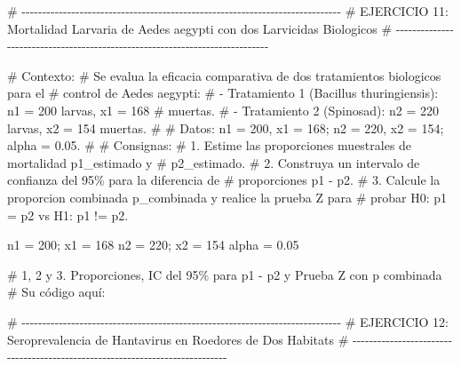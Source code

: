 \documentclass[
  spanish,
  letterpaper,
  DIV=11,
  numbers=noendperiod]{scrreprt}
\newenvironment{Shaded}{\begin{snugshade}}{\end{snugshade}}
\newcommand{\CommentTok}[1]{\textcolor[rgb]{0.37,0.37,0.37}{#1}}
\newcommand{\DecValTok}[1]{\textcolor[rgb]{0.68,0.00,0.00}{#1}}
\newcommand{\FloatTok}[1]{\textcolor[rgb]{0.68,0.00,0.00}{#1}}
\newcommand{\NormalTok}[1]{\textcolor[rgb]{0.00,0.23,0.31}{#1}}
\newcommand{\OtherTok}[1]{\textcolor[rgb]{0.00,0.23,0.31}{#1}}
\begin{document}
\begin{Shaded}
\begin{Highlighting}[]
\CommentTok{\# {-}{-}{-}{-}{-}{-}{-}{-}{-}{-}{-}{-}{-}{-}{-}{-}{-}{-}{-}{-}{-}{-}{-}{-}{-}{-}{-}{-}{-}{-}{-}{-}{-}{-}{-}{-}{-}{-}{-}{-}{-}{-}{-}{-}{-}{-}{-}{-}{-}{-}{-}{-}{-}{-}{-}{-}{-}{-}{-}{-}{-}{-}{-}{-}{-}{-}{-}{-}{-}{-}{-}{-}{-}{-}{-}{-}{-}}
\CommentTok{\# EJERCICIO 11: Mortalidad Larvaria de Aedes aegypti con dos Larvicidas Biologicos}
\CommentTok{\# {-}{-}{-}{-}{-}{-}{-}{-}{-}{-}{-}{-}{-}{-}{-}{-}{-}{-}{-}{-}{-}{-}{-}{-}{-}{-}{-}{-}{-}{-}{-}{-}{-}{-}{-}{-}{-}{-}{-}{-}{-}{-}{-}{-}{-}{-}{-}{-}{-}{-}{-}{-}{-}{-}{-}{-}{-}{-}{-}{-}{-}{-}{-}{-}{-}{-}{-}{-}{-}{-}{-}{-}{-}{-}{-}{-}{-}}

\CommentTok{\# Contexto:}
\CommentTok{\# Se evalua la eficacia comparativa de dos tratamientos biologicos para el}
\CommentTok{\# control de Aedes aegypti:}
\CommentTok{\#   {-} Tratamiento 1 (Bacillus thuringiensis): n1 = 200 larvas, x1 = 168}
\CommentTok{\#     muertas.}
\CommentTok{\#   {-} Tratamiento 2 (Spinosad): n2 = 220 larvas, x2 = 154 muertas.}
\CommentTok{\#}
\CommentTok{\# Datos: n1 = 200, x1 = 168; n2 = 220, x2 = 154; alpha = 0.05.}
\CommentTok{\#}
\CommentTok{\# Consignas:}
\CommentTok{\# 1. Estime las proporciones muestrales de mortalidad p1\_estimado y}
\CommentTok{\#    p2\_estimado.}
\CommentTok{\# 2. Construya un intervalo de confianza del 95\% para la diferencia de}
\CommentTok{\#    proporciones p1 {-} p2.}
\CommentTok{\# 3. Calcule la proporcion combinada p\_combinada y realice la prueba Z para}
\CommentTok{\#    probar H0: p1 = p2 vs H1: p1 != p2.}

\NormalTok{n1 }\OtherTok{=} \DecValTok{200}\NormalTok{; x1 }\OtherTok{=} \DecValTok{168}
\NormalTok{n2 }\OtherTok{=} \DecValTok{220}\NormalTok{; x2 }\OtherTok{=} \DecValTok{154}
\NormalTok{alpha }\OtherTok{=} \FloatTok{0.05}

\CommentTok{\# 1, 2 y 3. Proporciones, IC del 95\% para p1 {-} p2 y Prueba Z con p combinada}
\CommentTok{\# Su código aquí:}



\CommentTok{\# {-}{-}{-}{-}{-}{-}{-}{-}{-}{-}{-}{-}{-}{-}{-}{-}{-}{-}{-}{-}{-}{-}{-}{-}{-}{-}{-}{-}{-}{-}{-}{-}{-}{-}{-}{-}{-}{-}{-}{-}{-}{-}{-}{-}{-}{-}{-}{-}{-}{-}{-}{-}{-}{-}{-}{-}{-}{-}{-}{-}{-}{-}{-}{-}{-}{-}{-}{-}{-}{-}{-}{-}{-}{-}{-}{-}{-}}
\CommentTok{\# EJERCICIO 12: Seroprevalencia de Hantavirus en Roedores de Dos Habitats}
\CommentTok{\# {-}{-}{-}{-}{-}{-}{-}{-}{-}{-}{-}{-}{-}{-}{-}{-}{-}{-}{-}{-}{-}{-}{-}{-}{-}{-}{-}{-}{-}{-}{-}{-}{-}{-}{-}{-}{-}{-}{-}{-}{-}{-}{-}{-}{-}{-}{-}{-}{-}{-}{-}{-}{-}{-}{-}{-}{-}{-}{-}{-}{-}{-}{-}{-}{-}{-}{-}{-}{-}{-}{-}{-}{-}{-}{-}{-}{-}}


\end{Highlighting}
\end{Shaded}
\end{document}
